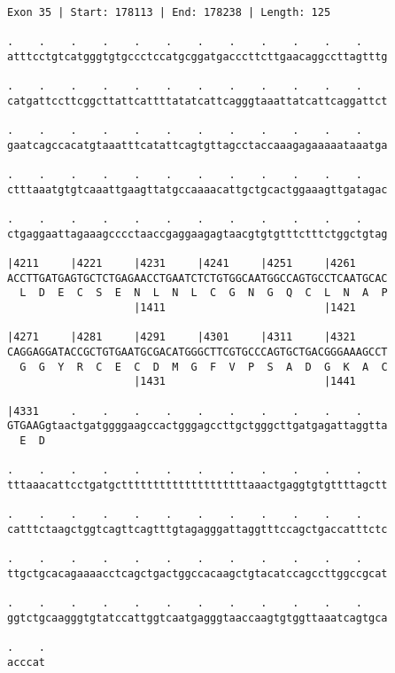 \documentclass{article}
\begin{document}
\begin{Verbatim}
Exon 35 | Start: 178113 | End: 178238 | Length: 125
 
.    .    .    .    .    .    .    .    .    .    .    .    
atttcctgtcatgggtgtgccctccatgcggatgacccttcttgaacaggccttagtttg
  
.    .    .    .    .    .    .    .    .    .    .    .    
catgattccttcggcttattcattttatatcattcagggtaaattatcattcaggattct
  
.    .    .    .    .    .    .    .    .    .    .    .    
gaatcagccacatgtaaatttcatattcagtgttagcctaccaaagagaaaaataaatga
  
.    .    .    .    .    .    .    .    .    .    .    .    
ctttaaatgtgtcaaattgaagttatgccaaaacattgctgcactggaaagttgatagac
  
.    .    .    .    .    .    .    .    .    .    .    .    
ctgaggaattagaaagcccctaaccgaggaagagtaacgtgtgtttctttctggctgtag
  
|4211     |4221     |4231     |4241     |4251     |4261     
ACCTTGATGAGTGCTCTGAGAACCTGAATCTCTGTGGCAATGGCCAGTGCCTCAATGCAC
  L  D  E  C  S  E  N  L  N  L  C  G  N  G  Q  C  L  N  A  P
                    |1411                         |1421     
  
|4271     |4281     |4291     |4301     |4311     |4321     
CAGGAGGATACCGCTGTGAATGCGACATGGGCTTCGTGCCCAGTGCTGACGGGAAAGCCT
  G  G  Y  R  C  E  C  D  M  G  F  V  P  S  A  D  G  K  A  C
                    |1431                         |1441     
  
|4331     .    .    .    .    .    .    .    .    .    .    
GTGAAGgtaactgatggggaagccactgggagccttgctgggcttgatgagattaggtta
  E  D                                                      
  
.    .    .    .    .    .    .    .    .    .    .    .    
tttaaacattcctgatgcttttttttttttttttttttaaactgaggtgtgttttagctt
  
.    .    .    .    .    .    .    .    .    .    .    .    
catttctaagctggtcagttcagtttgtagagggattaggtttccagctgaccatttctc
  
.    .    .    .    .    .    .    .    .    .    .    .    
ttgctgcacagaaaacctcagctgactggccacaagctgtacatccagccttggccgcat
  
.    .    .    .    .    .    .    .    .    .    .    .    
ggtctgcaagggtgtatccattggtcaatgagggtaaccaagtgtggttaaatcagtgca
  
.    .
acccat
\end{Verbatim}
\newpage
\end{document}
